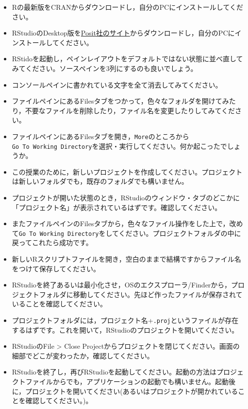 \documentclass[
  a4paper,
]{ltjsbook}
\providecommand{\tightlist}{%
  \setlength{\itemsep}{0pt}\setlength{\parskip}{0pt}}
\begin{document}
\begin{itemize}
\tightlist
\item
  Rの最新版をCRANからダウンロードし，自分のPCにインストールしてください。
\item
  RStudioのDesktop版を\href{https://posit.co/download/rstudio-desktop/}{Posit社のサイト}からダウンロードし，自分のPCにインストールしてください。
\item
  RStidoを起動し，ペインレイアウトをデフォルトではない状態に並べ直してみてください。ソースペインを3列にするのも良いでしょう。
\item
  コンソールペインに書かれている文字を全て消去してみてください。
\item
  ファイルペインにあるFilesタブをつかって，色々なフォルダを開けてみたり，不要なファイルを削除したり，ファイル名を変更したりしてみてください。
\item
  ファイルペインにあるFilesタブを開き，\texttt{More}のところから\texttt{Go\ To\ Working\ Directory}を選択・実行してください。何か起こったでしょうか。
\item
  この授業のために，新しいプロジェクトを作成してください。プロジェクトは新しいフォルダでも，既存のフォルダでも構いません。
\item
  プロジェクトが開いた状態のとき，RStudioのウィンドウ・タブのどこかに「プロジェクト名」が表示されているはずです。確認してください。
\item
  またファイルペインのFilesタブから，色々なファイル操作をした上で，改めて\texttt{Go\ To\ Working\ Directory}をしてください。プロジェクトフォルダの中に戻ってこれたら成功です。
\item
  新しいRスクリプトファイルを開き，空白のままで結構ですからファイル名をつけて保存してください。
\item
  RStudioを終了あるいは最小化させ，OSのエクスプローラ/Finderから，プロジェクトフォルダに移動してください。先ほど作ったファイルが保存されていることを確認してください。
\item
  プロジェクトフォルダには，プロジェクト名+\texttt{.proj}というファイルが存在するはずです。これを開いて，RStudioのプロジェクトを開いてください。
\item
  RStudioのFile \textgreater{} Close
  Projectからプロジェクトを閉じてください。画面の細部でどこが変わったか，確認してください。
\item
  RStudioを終了し，再びRStudioを起動してください。起動の方法はプロジェクトファイルからでも，アプリケーションの起動でも構いません。起動後に，プロジェクトを開いてください(あるいはプロジェクトが開かれていることを確認してください。)。
\end{itemize}
\end{document}
